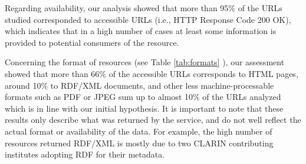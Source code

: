 \documentclass[11pt]{article}
\begin{document}
Regarding availability, our analysis showed that more than 95\% of the URLs
studied corresponded to accessible URLs (i.e., HTTP Response Code 200 OK), which
indicates that in a high number of cases at least some information is provided
to potential consumers of the resource.

Concerning the format of resources (see Table \ref{tab:formats} ), our
assessment showed that more than 66\% of the accessible URLs corresponds to HTML
pages, around 10\% to RDF/XML documents, and other less machine-processable
formats such as PDF or JPEG sum up to almost 10\% of the URLs analyzed which is
in line with our initial hypothesis. It is important to note that these results
only describe what was returned by the service, and do not well reflect the
actual format or availability of the data. For example, the high number of
resources returned RDF/XML is mostly due to two CLARIN contributing institutes
adopting RDF for their metadata.

%	
%	
%	
%	
\end{document}
